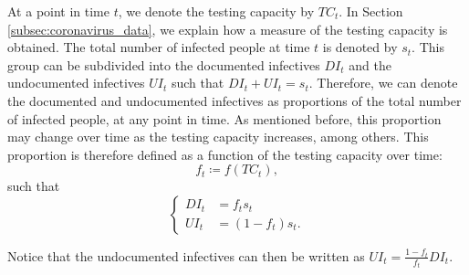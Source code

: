 \documentclass[12pt]{article}
\begin{document}
	At a point in time $t$, we denote the testing capacity by $TC_t$. In Section \ref{subsec:coronavirus_data}, we explain how a measure of the testing capacity is obtained. The total number of infected people at time $t$ is denoted by $s_t$. This group can be subdivided into the documented infectives $DI_t$ and the undocumented infectives $UI_t$ such that $DI_t + UI_t = s_t$. Therefore, we can denote the documented and undocumented infectives as proportions of the total number of infected people, at any point in time. As mentioned before, this proportion may change over time as the testing capacity increases, among others. This proportion is therefore defined as a function of the testing capacity over time:
	\begin{equation} \label{eq:f_t}
	f_t \coloneqq f(TC_t),
	\end{equation}
	such that
	\begin{equation*}
    	\begin{cases}
        	DI_t &= f_ts_t \\
        	UI_t &= (1-f_t)s_t.
    	\end{cases}
	\end{equation*}
	
	Notice that the undocumented infectives can then be written as $UI_t = \frac{1-f_t}{f_t}DI_t$. \\
	
\end{document}
